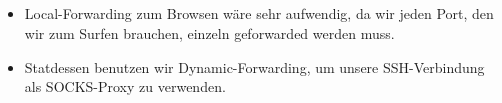 \documentclass{scrartcl}
\begin{document}
\subsection{}
\label{sub:4.3}
\begin{itemize}
  \item Local-Forwarding zum Browsen wäre sehr aufwendig, da wir jeden Port, den
  wir zum Surfen brauchen, einzeln geforwarded werden muss.
  \item Statdessen benutzen wir Dynamic-Forwarding, um unsere SSH-Verbindung als
  SOCKS-Proxy zu verwenden.
\end{itemize}
\end{document}
